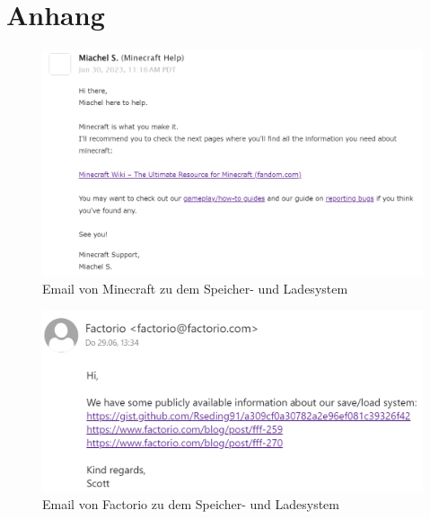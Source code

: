 \chapter{Anhang}\label{ch:appendix}

\begin{figure}[htp]
    \centering
    \includegraphics[width=1\textwidth]{images/Minecraft_Email.png}
    \caption{Email von Minecraft zu dem Speicher- und Ladesystem}
    \label{fig:minecraftMail}
\end{figure}

\begin{figure}[htp]
    \centering
    \includegraphics[width=1\textwidth]{images/Factorio_Email.png}
    \caption{Email von Factorio zu dem Speicher- und Ladesystem}
    \label{fig:factorioMail}
\end{figure}
